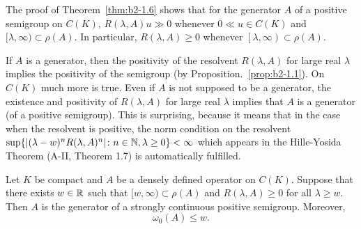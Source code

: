 \begin{remark}\label{rem:b2-1.7}
The proof of Theorem~\ref{thm:b2-1.6} shows that for the generator $A$ of a positive semigroup on $C(K)$, $R(\lambda,A)u \gg 0$ whenever $0 \ll u \in C(K)$ and $[\lambda,\infty) \subset \rho(A)$.
In particular, $R(\lambda,A) \geq 0$ whenever $\left[\lambda,\infty\right) \subset \rho(A)$.
\end{remark}

If $A$ is a generator, then the positivity of the resolvent $R(\lambda,A)$ for large real $\lambda$ implies the positivity of the semigroup (by Proposition.~\ref{prop:b2-1.1}).
On $C(K)$ much more is true.
Even if $A$ is not supposed to be a generator, the existence and positivity of $R(\lambda,A)$ for large real $\lambda$ implies that $A$ is a generator (of a positive semigroup).
This is surprising, because it means that in the case when the resolvent is positive, the norm condition on the resolvent $\sup \{|(\lambda-w)^{n}R(\lambda,A)^{n}| \colon n \in \mathbb{N}, \lambda \geq 0\} < \infty$ which appears in the Hille-Yosida Theorem (A-II, Theorem 1.7) is automatically fulfilled.

\begin{theorem}\label{thm:b2-1.8}
Let $K$ be compact and $A$ be a densely defined operator on $C(K)$.
Suppose that there exists $w \in \mathbb{R}$ such that $[w,\infty) \subset \rho(A)$ and $R(\lambda,A) \geq 0$ for all $\lambda \geq w$.
Then $A$ is the generator of a strongly continuous positive semigroup.
Moreover,
\begin{equation}\label{eq:b2-1.3}
    \omega_{0}(A) \leq w.
\end{equation}
\end{theorem}

